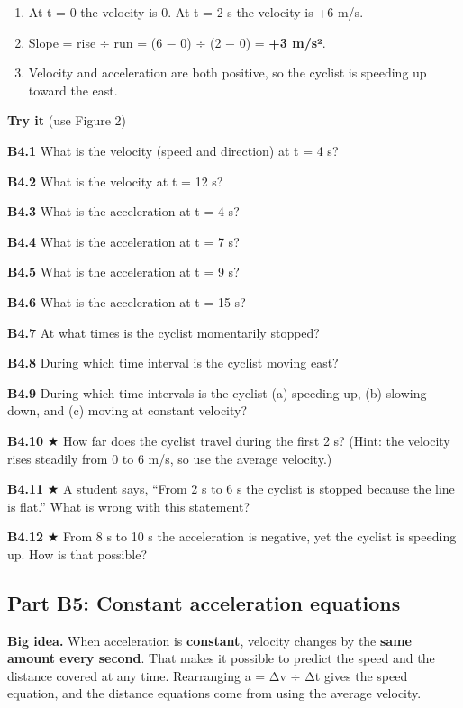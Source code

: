 \documentclass[
]{article}
\providecommand{\tightlist}{%
  \setlength{\itemsep}{0pt}\setlength{\parskip}{0pt}}
\begin{document}
\begin{enumerate}
\def\labelenumi{\arabic{enumi}.}
\tightlist
\item
  At t = 0 the velocity is 0. At t = 2 s the velocity is +6 m/s.
\item
  Slope = rise ÷ run = (6 − 0) ÷ (2 − 0) = \textbf{+3 m/s²}.
\item
  Velocity and acceleration are both positive, so the cyclist is
  speeding up toward the east.
\end{enumerate}

\textbf{Try it} (use Figure 2)

\textbf{B4.1} What is the velocity (speed and direction) at t = 4 s?

\textbf{B4.2} What is the velocity at t = 12 s?

\textbf{B4.3} What is the acceleration at t = 4 s?

\textbf{B4.4} What is the acceleration at t = 7 s?

\textbf{B4.5} What is the acceleration at t = 9 s?

\textbf{B4.6} What is the acceleration at t = 15 s?

\textbf{B4.7} At what times is the cyclist momentarily stopped?

\textbf{B4.8} During which time interval is the cyclist moving east?

\textbf{B4.9} During which time intervals is the cyclist (a) speeding
up, (b) slowing down, and (c) moving at constant velocity?

\textbf{B4.10} ★ How far does the cyclist travel during the first 2 s?
(Hint: the velocity rises steadily from 0 to 6 m/s, so use the average
velocity.)

\textbf{B4.11} ★ A student says, ``From 2 s to 6 s the cyclist is
stopped because the line is flat.'' What is wrong with this statement?

\textbf{B4.12} ★ From 8 s to 10 s the acceleration is negative, yet the
cyclist is speeding up. How is that possible?

\subsection{Part B5: Constant acceleration
equations}\label{part-b5-constant-acceleration-equations}

\textbf{Big idea.} When acceleration is \textbf{constant}, velocity
changes by the \textbf{same amount every second}. That makes it possible
to predict the speed and the distance covered at any time. Rearranging a
= Δv ÷ Δt gives the speed equation, and the distance equations come from
using the average velocity.
\end{document}
